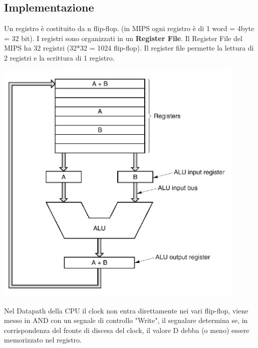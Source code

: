 \documentclass[12pt, a4paper, openany]{book}
\begin{document}
\subsection*{Implementazione}
Un registro è costituito da n flip-flop. (in MIPS ogni registro è di 1 word = 4byte = 32 bit).
I registri sono organizzati in un \textbf{Register File}.
Il Register File del MIPS ha 32 registri (32*32 = 1024 flip-flop).
Il register file permette la lettura di 2 registri e la scrittura di 1 registro.
\begin{center}
    \includegraphics[width=120mm, scale=0.5]{registri.png}
\end{center}
Nel Datapath della CPU il clock non entra direttamente nei vari flip-flop,
viene messo in AND con un segnale di controllo "Write", il segnalare determina se,
in corrispondenza del fronte di discesa del clock, il valore D debba (o meno)
essere memorizzato nel registro.
\end{document}
